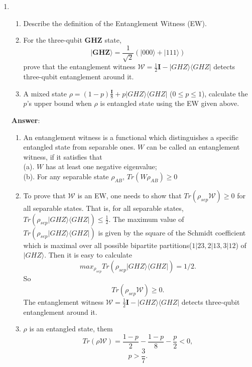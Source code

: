 \documentclass[english,aps,onecolumn]{revtex4-1}
\begin{document}
\begin{enumerate}[1.]
\item
	\begin{enumerate}[(1)]
	\item Describe the definition of the Entanglement Witness (EW).
	\item For the three-qubit \textbf{GHZ} state,
     $$|\textbf{GHZ}\rangle=\frac{1}{\sqrt{2}}(|000\rangle+|111\rangle)$$
     prove that the entanglement witness $\mathcal{W} = \frac{1}{2} \textbf{I} - |GHZ\rangle\langle GHZ|$ detects three-qubit entanglement around it.
    \item A mixed state $\rho = (1-p)\frac{\textbf{I}}{8} + p |GHZ\rangle\langle GHZ|$ ($0 \le p \le1$), calculate the $p$'s upper bound when $\rho$ is entangled state using the EW given above.
	\end{enumerate}


\textbf{Answer}:
	\begin{enumerate}[(1)]
	\item
An entanglement witness is a functional which distinguishes a specific entangled state from separable ones.
$W$ can be called an entanglement witness, if it satisfies that\\
(a). $W$ has at least one negative eigenvalue;\\
(b). For any separable state $\rho_{AB}$, $Tr(W \rho_{AB}) \geq 0$
    \item
    To prove that $\mathcal{W}$ is an EW, one needs to show that $Tr(\rho_{sep} \mathcal{W}) \ge 0$ for all separable states. That is, for all separable states, $Tr(\rho_{sep} |GHZ\rangle\langle GHZ|) \le \frac{1}{2}$. The maximum value of $Tr(\rho_{sep} |GHZ\rangle\langle GHZ|)$ is given by the square of the Schmidt coefficient which is maximal over all possible bipartite partitions($1|23, 2|13, 3|12$) of $|GHZ\rangle$. Then it is easy to calculate
    $$max_{\rho_{sep}} Tr(\rho_{sep} |GHZ\rangle\langle GHZ|) = 1/2.$$
    So
    $$Tr(\rho_{sep} \mathcal{W}) \ge 0.$$
    The entanglement witness $\mathcal{W} = \frac{1}{2} \textbf{I} - |GHZ\rangle\langle GHZ|$ detects three-qubit entanglement around it.
    \item
    $\rho$ is an entangled state, them
    $$Tr(\rho \mathcal{W}) = \frac{1-p}{2} - \frac{1-p}{8} - \frac{p}{2} < 0, $$
    $$ p > \frac{3}{7}.$$
     \end{enumerate}


\end{enumerate}
\end{document}
